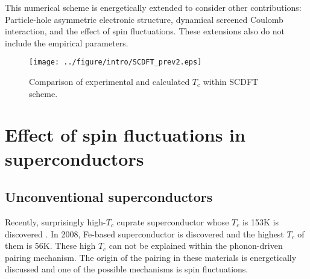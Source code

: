 This numerical scheme is energetically extended to consider other contributions:
Particle-hole asymmetric electronic structure\cite{RA2013phasy}, dynamical screened Coulomb 
interaction\cite{RA2013}, and the effect of spin fluctuations\cite{Essenberger2014}.
These extensions also do not include the empirical parameters. 

\begin{figure} %
	\centering
	\texttt{[image: ../figure/intro/SCDFT\_prev2.eps]}
	\caption{Comparison of experimental and calculated $T_c$ 
		within SCDFT scheme\cite{Marques2005, Sanna2007, Floris2005}.}
	\label{fig:scdft_compare}
\end{figure}


\section{Effect of spin fluctuations in superconductors} %
\subsection{Unconventional superconductors}
Recently, surprisingly high-$T_c$ cuprate superconductor whose $T_c$ is 153K is discovered
\cite{Bednorz1986}. In 2008, Fe-based superconductor is discovered\cite{Kamihara2008} and the highest
$T_c$ of them is 56K\cite{wang2008}. These high $T_c$ can not be explained within the phonon-driven
pairing mechanism. The origin of the pairing in these materials is energetically discussed
\cite{Scalapino2012} and one of the possible mechanisms is spin fluctuations.


